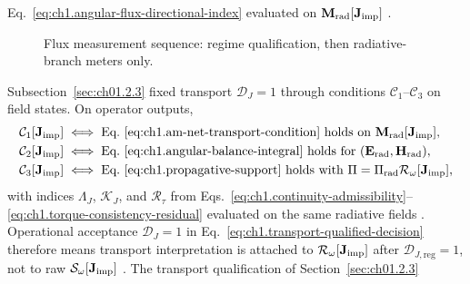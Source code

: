 Eq.~\eqref{eq:ch1.angular-flux-directional-index} evaluated on
\(\mathbf{M}_{\mathrm{rad}}[\mathbf{J}_{\mathrm{imp}}]\) \cite{stratton1941}.
\begin{figure}[t]
\centering
{}
\caption{Flux measurement sequence: regime qualification, then radiative-branch meters only.}
\label{fig:ch2.flux-meter-measurement chain}
\end{figure}
Subsection~\ref{sec:ch01.2.3} fixed transport $\mathcal{D}_J=1$ through conditions
\(\mathcal{C}_1\)--\(\mathcal{C}_3\) on field states. On operator outputs,
\begin{equation}
\label{eq:ch2.transport-triad-on-R}
\begin{aligned}
\mathcal{C}_1[\Jimp]
&\iff
\text{Eq.~\eqref{eq:ch1.am-net-transport-condition} holds on}\ \mathbf{M}_{\mathrm{rad}}[\Jimp],\\
\mathcal{C}_2[\Jimp]
&\iff
\text{Eq.~\eqref{eq:ch1.angular-balance-integral} holds for}\ (\E_{\mathrm{rad}},\H_{\mathrm{rad}}),\\
\mathcal{C}_3[\Jimp]
&\iff
\text{Eq.~\eqref{eq:ch1.propagative-support} holds with}\ 
\Pi=\Pi_{\mathrm{rad}}\mathcal{R}_\omega[\Jimp],
\end{aligned}
\end{equation}
with indices \(\Lambda_J\), \(\mathcal{K}_J\), and \(\mathcal{R}_\tau\) from
Eqs.~\eqref{eq:ch1.continuity-admissibility}--\eqref{eq:ch1.torque-consistency-residual}
evaluated on the same radiative fields \cite{stratton1941}. Operational acceptance
\(\mathcal{D}_J=1\) in Eq.~\eqref{eq:ch1.transport-qualified-decision} therefore means
transport interpretation is attached to \(\mathcal{R}_\omega[\mathbf{J}_{\mathrm{imp}}]\) after
\(\mathcal{D}_{J,\mathrm{reg}}=1\), not to raw \(\mathcal{S}_\omega[\mathbf{J}_{\mathrm{imp}}]\)
\cite{stratton1941}. The transport qualification of Section~\ref{sec:ch01.2.3}
